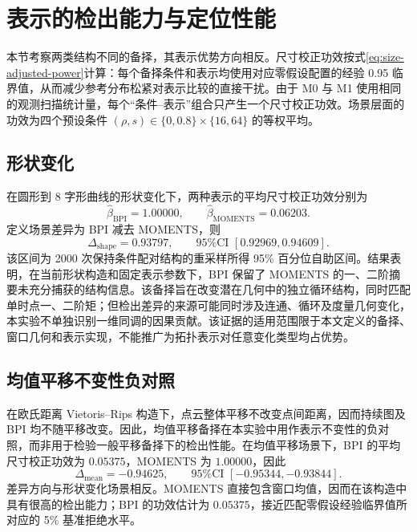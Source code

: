 \section{表示的检出能力与定位性能}\label{sec:h1}

本节考察两类结构不同的备择，其表示优势方向相反。尺寸校正功效按式\eqref{eq:size-adjusted-power}计算：每个备择条件和表示均使用对应零假设配置的经验 0.95 临界值，从而减少参考分布松紧对表示比较的直接干扰。由于 M0 与 M1 使用相同的观测扫描统计量，每个“条件--表示”组合只产生一个尺寸校正功效。场景层面的功效为四个预设条件 $(\rho,s)\in\{0,0.8\}\times\{16,64\}$ 的等权平均。

\subsection{形状变化}\label{sec:h1-shape}

在圆形到 8 字形曲线的形状变化下，两种表示的平均尺寸校正功效分别为
\[
 \widehat\beta_{\mathrm{BPI}}=1.00000,
 \qquad
 \widehat\beta_{\mathrm{MOMENTS}}=0.06203.
\]
定义场景差异为 BPI 减去 MOMENTS，则
\begin{equation}\label{eq:shape-power-diff}
 \Delta_{\mathrm{shape}}=0.93797,
 \qquad
 \text{95\% CI }[0.92969,0.94609].
\end{equation}
该区间为 2000 次保持条件配对结构的重采样所得 95\% 百分位自助区间。结果表明，在当前形状构造和固定表示参数下，BPI 保留了 MOMENTS 的一、二阶摘要未充分捕获的结构信息。该备择旨在改变潜在几何中的独立循环结构，同时匹配单时点一、二阶矩；但检出差异的来源可能同时涉及连通、循环及度量几何变化，本实验不单独识别一维同调的因果贡献。该证据的适用范围限于本文定义的备择、窗口几何和表示实现，不能推广为拓扑表示对任意变化类型均占优势。

\subsection{均值平移不变性负对照}\label{sec:h1-mean}

在欧氏距离 Vietoris--Rips 构造下，点云整体平移不改变点间距离，因而持续图及 BPI 均不随平移改变。因此，均值平移备择在本实验中用作表示不变性的负对照，而非用于检验一般平移备择下的检出性能。在均值平移场景下，BPI 的平均尺寸校正功效为 $0.05375$，MOMENTS 为 $1.00000$，因此
\begin{equation}\label{eq:mean-power-diff}
 \Delta_{\mathrm{mean}}=-0.94625,
 \qquad
 \text{95\% CI }[-0.95344,-0.93844].
\end{equation}
差异方向与形状变化场景相反。MOMENTS 直接包含窗口均值，因而在该构造中具有很高的检出能力；BPI 的功效估计为 $0.05375$，接近匹配零假设经验临界值所对应的 5\% 基准拒绝水平。

